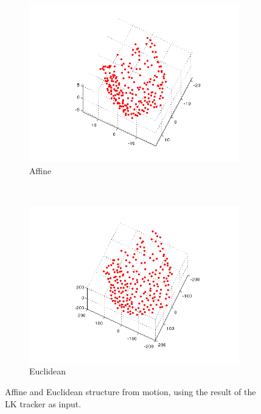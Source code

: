 \documentclass[a4paper,10pt]{article}
\begin{document}
\begin{figure}[h!tb]

        \centering
        \begin{subfigure}{0.3\textwidth}
                \centering
                \includegraphics[width=\textwidth]{AffineStructureLK}
                \caption{Affine}
        \end{subfigure}
        ~
        \begin{subfigure}{0.3\textwidth}
                \centering
                \includegraphics[width=\textwidth]{EuclideanStructureLK}
                \caption{Euclidean}
        \end{subfigure}

\caption{Affine and Euclidean structure from motion, using the result of the LK tracker as input.}
\label{fig:kamikaze}      
\end{figure}
\end{document}
